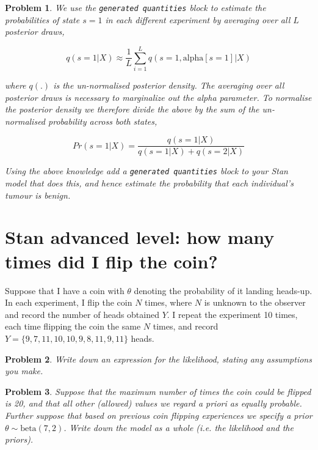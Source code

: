\documentclass{article}
\newtheorem{problem}{Problem}[section]
\begin{document}
\begin{problem}
	We use the \texttt{generated quantities} block to estimate the probabilities of state $s=1$ in each different experiment by averaging over all $L$ posterior draws,
	
	\begin{equation}
	q(s=1|X) \approx \frac{1}{L} \sum_{i=1}^{L} q(s=1,\text{alpha}[s=1]|X)
	\end{equation}
	
	where $q(.)$ is the un-normalised posterior density. The averaging over all posterior draws is necessary to marginalize out the alpha parameter. To normalise the posterior density we therefore divide the above by the sum of the un-normalised probability across both states,
	
	\begin{equation}
	Pr(s=1|X) = \frac{q(s=1|X)}{q(s=1|X)+q(s=2|X)}
	\end{equation} 
	
	Using the above knowledge add a \texttt{generated quantities} block to your Stan model that does this, and hence estimate the probability that each individual's tumour is benign.
\end{problem}


\section{Stan advanced level: how many times did I flip the coin?}
Suppose that I have a coin with $\theta$ denoting the probability of it landing heads-up. In each experiment, I flip the coin $N$ times, where $N$ is unknown to the observer and record the number of heads obtained $Y$. I repeat the experiment 10 times, each time flipping the coin the same $N$ times, and record $Y=\{9,7,11,10,10,9,8,11,9,11\}$ heads.

\begin{problem}
	Write down an expression for the likelihood, stating any assumptions you make.
\end{problem}

\begin{problem}
Suppose that the maximum number of times the coin could be flipped is 20, and that all other (allowed) values we regard \textit{a priori} as equally probable. Further suppose that based on previous coin flipping experiences we specify a prior $\theta\sim \text{beta}(7,2)$. Write down the model as a whole (i.e. the likelihood and the priors).
\end{problem}
\end{document}
